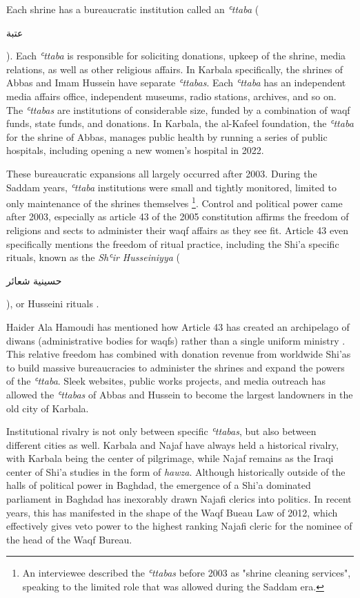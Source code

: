 Each shrine has a bureaucratic institution called an \emph{\emph{ʿttaba}} (\begin{Arabic}عتبة\end{Arabic}). Each \emph{ʿttaba} is responsible for soliciting donations, upkeep of the shrine, media relations, as well as other religious affairs. In Karbala specifically, the shrines of Abbas and Imam Hussein have separate \emph{ʿttabas}. Each \emph{ʿttaba} has an independent media affairs office, independent museums, radio stations, archives, and so on. The \emph{ʿttabas} are institutions of considerable size, funded by a combination of waqf funds, state funds, and donations. In Karbala, the al-Kafeel foundation, the \emph{ʿttaba} for the shrine of Abbas, manages public health by running a series of public hospitals, including opening a new women's hospital in 2022. 

These bureaucratic expansions all largely occurred after 2003. During the Saddam years, \emph{ʿttaba} institutions were small and tightly monitored, limited to only maintenance of the shrines themselves \footnote{An interviewee described the \emph{ʿttabas} before 2003 as "shrine cleaning services", speaking to the limited role that was allowed during the Saddam era.}. Control and political power came after 2003, especially as article 43 of the 2005 constitution affirms the freedom of religions and sects to administer their waqf affairs as they see fit. Article 43 even specifically mentions the freedom of ritual practice, including the Shi'a specific rituals, known as the \emph{Shʿir Husseiniyya} (\begin{Arabic}حسينية شعائر\end{Arabic}), or Husseini rituals \cite{jawad_iraqi_2003}. 

Haider Ala Hamoudi has mentioned how Article 43 has created an archipelago of diwans (administrative bodies for waqfs) rather than a single uniform ministry \cite[220]{hamoudi_engagements_2020}. This relative freedom has combined with donation revenue from worldwide Shi'as to build massive bureaucracies to administer the shrines and expand the powers of the \emph{ʿttaba}. Sleek websites, public works projects, and media outreach has allowed the \emph{ʿttabas} of Abbas and Hussein to become the largest landowners in the old city of Karbala. 

Institutional rivalry is not only between specific \emph{ʿttabas}, but also between different cities as well. Karbala and Najaf have always held a historical rivalry, with Karbala being the center of pilgrimage, while Najaf remains as the Iraqi center of Shi'a studies in the form of \emph{hawza}. Although historically outside of the halls of political power in Baghdad, the emergence of a Shi'a dominated parliament in Baghdad has inexorably drawn Najafi clerics into politics. In recent years, this has manifested in the shape of the Waqf Bueau Law of 2012, which effectively gives veto power to the highest ranking Najafi cleric for the nominee of the head of the Waqf Bureau. 

